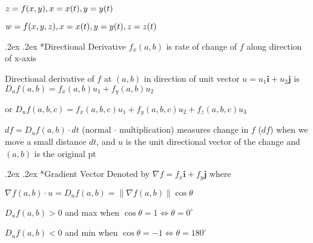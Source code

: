 \documentclass[10pt,landscape,a4paper]{article}
\makeatletter
\renewcommand{\subsection}{\@startsection{subsection}{1}{0mm}%
                                {.2ex}%
                                {.2ex}%
                                {\sffamily\bfseries}}
\makeatother
\begin{document}
\begin{multicols*}{4}
\begin{wrapfigure}[6]{l}{0pt}
{
    }
  \end{wrapfigure}

  $z = f(x,y), \\x=x(t), y=y(t)$

  $w = f(x,y,z), \\x=x(t), \\y=y(t), z=z(t)$

  \subsection*{Directional Derivative}
  $f_x(a,b)$ is rate of change of $f$ along direction of x-axis

  Directional derivative of $f$ at $(a,b)$ in direction of unit vector $u = u_1\mathbf{i} + u_2\mathbf{j}$ is $D_uf(a,b)=f_x(a,b)u_1 + f_y(a,b)u_2$

  or $D_uf(a,b,c)=f_x(a,b,c)u_1 + f_y(a,b,c)u_2 + f_z(a,b,c)u_3$

  $df = D_uf(a,b)\cdot dt$ (normal $\cdot$ multiplication) measures change in $f$ ($df$) when we move a small distance $dt$, and $u$ is the unit directional vector of the change and $(a,b)$ is the original pt

  \subsection*{Gradient Vector}
  Denoted by $\nabla f = f_x\mathbf{i} + f_y\mathbf{j}$ where

  $\nabla f(a,b) \cdot u = D_uf(a,b) = \lVert\nabla f(a,b)\rVert\cos\theta$

  $D_uf(a,b) >0$ and max when $\cos \theta = 1 \iff \theta = 0^{\circ}$

  $D_uf(a,b) <0$ and min when $\cos \theta = -1 \iff \theta = 180^{\circ}$


\end{multicols*}
\end{document}

